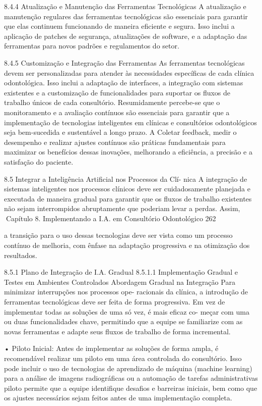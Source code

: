 8.4.4    Atualização e Manutenção das Ferramentas Tecnológicas
A atualização e manutenção regulares das ferramentas tecnológicas são essenciais
para garantir que elas continuem funcionando de maneira eficiente e segura. Isso inclui
a aplicação de patches de segurança, atualizações de software, e a adaptação das
ferramentas para novos padrões e regulamentos do setor.

8.4.5    Customização e Integração das Ferramentas
As ferramentas tecnológicas devem ser personalizadas para atender às necessidades
específicas de cada clínica odontológica. Isso inclui a adaptação de interfaces, a
integração com sistemas existentes e a customização de funcionalidades para suportar
os fluxos de trabalho únicos de cada consultório.
         Resumidamente percebe-se que o monitoramento e a avaliação contínuos são
essenciais para garantir que a implementação de tecnologias inteligentes em clínicas e
consultórios odontológicos seja bem-sucedida e sustentável a longo prazo. A Coletar
feedback, medir o desempenho e realizar ajustes contínuos são práticas fundamentais
para maximizar os benefícios dessas inovações, melhorando a eficiência, a precisão e
a satisfação do paciente.


8.5     Integrar a Inteligência Artificial nos Processos da Clí-
        nica
A integração de sistemas inteligentes nos processos clínicos deve ser cuidadosamente
planejada e executada de maneira gradual para garantir que os fluxos de trabalho
existentes não sejam interrompidos abruptamente que poderiam levar a perdas. Assim,
Capítulo 8. Implementando a I.A. em Consultório Odontológico                       262


a transição para o uso dessas tecnologias deve ser vista como um processo contínuo
de melhoria, com ênfase na adaptação progressiva e na otimização dos resultados.

8.5.1     Plano de Integração de I.A. Gradual
8.5.1.1   Implementação Gradual e Testes em Ambientes Controlados
Abordagem Gradual na Integração Para minimizar interrupções nos processos ope-
racionais da clínica, a introdução de ferramentas tecnológicas deve ser feita de forma
progressiva. Em vez de implementar todas as soluções de uma só vez, é mais eficaz co-
meçar com uma ou duas funcionalidades chave, permitindo que a equipe se familiarize
com as novas ferramentas e adapte seus fluxos de trabalho de forma incremental.

    • Piloto Inicial: Antes de implementar as soluções de forma ampla, é recomendável
      realizar um piloto em uma área controlada do consultório. Isso pode incluir o uso
      de tecnologias de aprendizado de máquina (machine learning) para a análise de
      imagens radiográficas ou a automação de tarefas administrativas piloto permite
      que a equipe identifique desafios e barreiras iniciais, bem como que os ajustes
      necessários sejam feitos antes de uma implementação completa.

